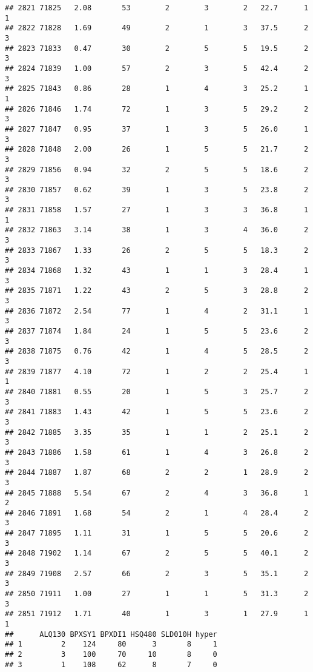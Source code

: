 \documentclass[
]{article}
\begin{document}
\begin{verbatim}
## 2821 71825   2.08       53        2        3        2   22.7      1      1
## 2822 71828   1.69       49        2        1        3   37.5      2      3
## 2823 71833   0.47       30        2        5        5   19.5      2      3
## 2824 71839   1.00       57        2        3        5   42.4      2      3
## 2825 71843   0.86       28        1        4        3   25.2      1      1
## 2826 71846   1.74       72        1        3        5   29.2      2      3
## 2827 71847   0.95       37        1        3        5   26.0      1      3
## 2828 71848   2.00       26        1        5        5   21.7      2      3
## 2829 71856   0.94       32        2        5        5   18.6      2      3
## 2830 71857   0.62       39        1        3        5   23.8      2      3
## 2831 71858   1.57       27        1        3        3   36.8      1      1
## 2832 71863   3.14       38        1        3        4   36.0      2      3
## 2833 71867   1.33       26        2        5        5   18.3      2      3
## 2834 71868   1.32       43        1        1        3   28.4      1      3
## 2835 71871   1.22       43        2        5        3   28.8      2      3
## 2836 71872   2.54       77        1        4        2   31.1      1      3
## 2837 71874   1.84       24        1        5        5   23.6      2      3
## 2838 71875   0.76       42        1        4        5   28.5      2      3
## 2839 71877   4.10       72        1        2        2   25.4      1      1
## 2840 71881   0.55       20        1        5        3   25.7      2      3
## 2841 71883   1.43       42        1        5        5   23.6      2      3
## 2842 71885   3.35       35        1        1        2   25.1      2      3
## 2843 71886   1.58       61        1        4        3   26.8      2      3
## 2844 71887   1.87       68        2        2        1   28.9      2      3
## 2845 71888   5.54       67        2        4        3   36.8      1      2
## 2846 71891   1.68       54        2        1        4   28.4      2      3
## 2847 71895   1.11       31        1        5        5   20.6      2      3
## 2848 71902   1.14       67        2        5        5   40.1      2      3
## 2849 71908   2.57       66        2        3        5   35.1      2      3
## 2850 71911   1.00       27        1        1        5   31.3      2      3
## 2851 71912   1.71       40        1        3        1   27.9      1      1
##      ALQ130 BPXSY1 BPXDI1 HSQ480 SLD010H hyper
## 1         2    124     80      3       8     1
## 2         3    100     70     10       8     0
## 3         1    108     62      8       7     0

\end{verbatim}
\end{document}

